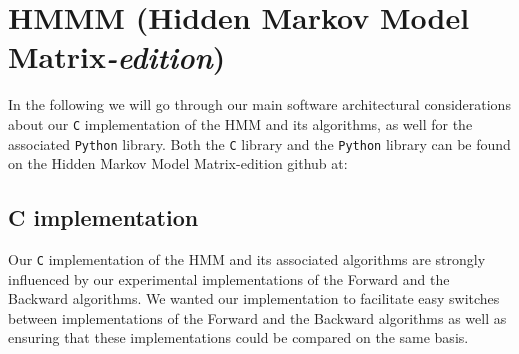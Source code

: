 \section{HMMM (Hidden Markov Model Matrix{\small\textit{-edition}})}\label{sec:hmmmlib}

In the following we will go through our main software architectural considerations about our \texttt{C} implementation of the HMM and its algorithms, as well for the associated \texttt{Python} library. Both the \texttt{C} library and the \texttt{Python} library can be found on the Hidden Markov Model Matrix-edition  github at: 

\subsection{C implementation}

Our \texttt{C} implementation of the HMM and its associated algorithms are strongly influenced by our experimental implementations of the Forward and the Backward algorithms. We wanted our implementation to facilitate easy switches between implementations of the Forward and the Backward algorithms as well as ensuring that these implementations could be compared on the same basis.

